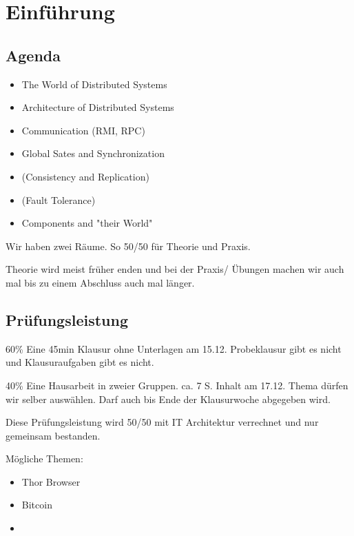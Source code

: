 \documentclass[a4paper]{article}
\title{\docTitle}
\author{Moritz}
\date{\today}
\begin{document}
\maketitle
\tableofcontents


\section{Einführung}

\subsection{Agenda}

\begin{itemize}
    \item The World of Distributed Systems
    \item Architecture of Distributed Systems
    \item Communication (RMI, RPC)
    \item Global Sates and Synchronization
    \item (Consistency and Replication)
    \item (Fault Tolerance)
    \item Components and "their World"
\end{itemize}

Wir haben zwei Räume. So 50/50 für Theorie und Praxis.

Theorie wird meist früher enden und bei der Praxis/ Übungen machen wir auch mal bis zu einem Abschluss auch mal länger.

\subsection{Prüfungsleistung}

60\% Eine 45min Klausur ohne Unterlagen am 15.12. Probeklausur gibt es nicht und Klausuraufgaben gibt es nicht.

40\% Eine Hausarbeit in zweier Gruppen. ca. 7 S. Inhalt am 17.12. Thema dürfen wir selber auswählen. Darf auch bis Ende der Klausurwoche abgegeben wird.

Diese Prüfungsleistung wird 50/50 mit IT Architektur verrechnet und nur gemeinsam bestanden.

Mögliche Themen:

\begin{itemize}
    \item Thor Browser
    \item Bitcoin
    \item 
\end{itemize}
\end{document}

